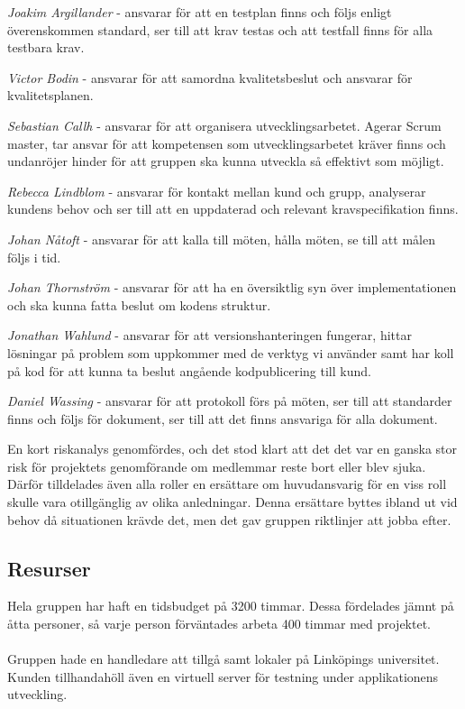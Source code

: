 \begin{description}[leftmargin=!,labelwidth=\widthof{\bfseries Konfigurationsansvarig}] %
	\item[Testledare] \textit{Joakim Argillander} - ansvarar för att en testplan finns och följs enligt överenskommen standard, ser till att krav testas och att testfall finns för alla testbara krav.	
	\item[Kvalitetsansvarig] \textit{Victor Bodin} - ansvarar för att samordna kvalitetsbeslut och ansvarar för kvalitetsplanen.
	\item[Utvecklingsledare] \textit{Sebastian Callh} - ansvarar för att organisera utvecklingsarbetet. Agerar Scrum master, tar ansvar för att kompetensen som utvecklingsarbetet kräver finns och undanröjer hinder för att gruppen ska kunna utveckla så effektivt som möjligt.
	\item[Analysansvarig] \textit{Rebecca Lindblom} - ansvarar för kontakt mellan kund och grupp, analyserar kundens behov och ser till att en uppdaterad och relevant kravspecifikation finns.
	\item[Teamledare] \textit{Johan Nåtoft} - ansvarar för att kalla till möten, hålla möten, se till att målen följs i tid.
	\item[Arkitekt] \textit{Johan Thornström} - ansvarar för att ha en översiktlig syn över implementationen och ska kunna fatta beslut om kodens struktur.
	\item[Konfigurationsansvarig] \textit{Jonathan Wahlund} - ansvarar för att versionshanteringen fungerar, hittar lösningar på problem som uppkommer med de verktyg vi använder samt har koll på kod för att kunna ta beslut angående kodpublicering till kund.
	\item[Dokumentansvarig] \textit{Daniel Wassing} - ansvarar för att protokoll förs på möten, ser till att standarder finns och följs för dokument, ser till att det finns ansvariga för alla dokument.
	
\end{description}
En kort riskanalys genomfördes, och det stod klart att det det var en ganska stor risk för projektets genomförande om medlemmar reste bort eller blev sjuka. Därför tilldelades även alla roller en ersättare om huvudansvarig för en viss roll skulle vara otillgänglig av olika anledningar. Denna ersättare byttes ibland ut vid behov då situationen krävde det, men det gav gruppen riktlinjer att jobba efter.

\subsection{Resurser} 
Hela gruppen har haft en tidsbudget på 3200 timmar. Dessa fördelades jämnt på åtta personer, så varje person förväntades arbeta 400 timmar med projektet.
\\ \\
Gruppen hade en handledare att tillgå samt lokaler på Linköpings universitet. Kunden tillhandahöll även en virtuell server för testning under applikationens utveckling.

